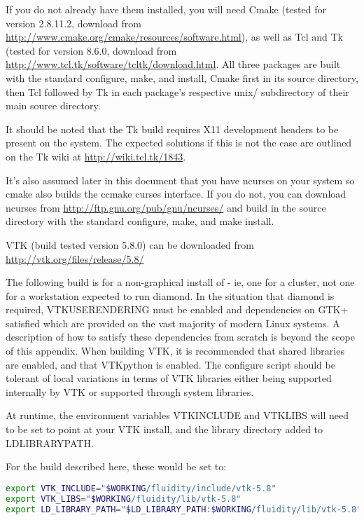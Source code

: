 If you do not already have them installed, you will need Cmake (tested for
version 2.8.11.2, download from
\url{http://www.cmake.org/cmake/resources/software.html}), as well as Tcl and
Tk (tested for version 8.6.0, download from
\url{http://www.tcl.tk/software/tcltk/download.html}. All three packages are
built with the standard configure, make, and install, Cmake first in its source
directory, then Tcl followed by Tk in each package's respective unix/
subdirectory of their main source directory.

It should be noted that the Tk build requires X11 development headers to be
present on the system. The expected solutions if this is not the case are
outlined on the Tk wiki at \url{http://wiki.tcl.tk/1843}.

It's also assumed later in this document that you have ncurses on your system
so cmake also builds the ccmake curses interface. If you do not, you can
download ncurses from \url{http://ftp.gnu.org/pub/gnu/ncurses/} and build in
the source directory with the standard configure, make, and make install.

VTK (build tested version 5.8.0) can be downloaded from
\url{http://vtk.org/files/release/5.8/}

The following build is for a non-graphical install of \fluidity - ie, one for a
cluster, not one for a workstation expected to run diamond. In the situation
that diamond is required, VTK{\textunderscore}USE{\textunderscore}RENDERING
must be enabled and dependencies on GTK+ satisfied which are provided on the
vast majority of modern Linux systems. A description of how to satisfy these
dependencies from scratch is beyond the scope of this appendix. When building
VTK, it is recommended that shared libraries are enabled, and that VTKpython is
enabled. The \fluidity configure script should be tolerant of local variations
in terms of VTK libraries either being supported internally by VTK or supported
through system libraries.

At runtime, the environment variables VTK{\textunderscore}INCLUDE and
VTK{\textunderscore}LIBS will need to be set to point at your VTK install, and
the library directory added to LD{\textunderscore}LIBRARY{\textunderscore}PATH.

For the build described here, these would be set to:

\begin{lstlisting}[language=bash]
export VTK_INCLUDE="$WORKING/fluidity/include/vtk-5.8"
export VTK_LIBS="$WORKING/fluidity/lib/vtk-5.8"
export LD_LIBRARY_PATH="$LD_LIBRARY_PATH:$WORKING/fluidity/lib/vtk-5.8"
\end{lstlisting}

